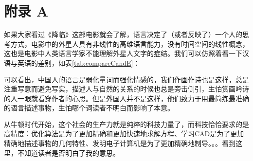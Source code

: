 \documentclass[UTF8,oneside]{ctexbook}
\begin{document}
\chapter*{附录 A}\label{fuluA}
	  如果大家看过《降临》这部电影就会了解，语言决定了（或者反映了）一个人的思考方式，电影中的外星人具有非线性的高维语言能力，没有时间空间的线性概念，这也是电影中人类语言学家不能理解外星人文字的症结。我们可以仿照着看一下汉语与英语的差别，如表\ref{tab:compareCandE}：

	  \begin{table}[!htb]
		  \renewcommand{\arraystretch}{1.3} %
		  \caption{中英对比}\label{tab:compareCandE}
		  \centering
		  \vspace{0.2cm}
	  \end{table}
	  
	  可以看出，中国人的语言是弱化量词而强化情感的，我们作画作诗也是这样，总是注重写意而避免写实，描述人与自然的关系的时候也总是旁击侧引，生怕赏画吟诗的人一眼就看穿作者的心思。但是外国人并不是这样，他们致力于用最简练最准确的语言描述事物，生怕哪个词读者不明白而影响了本意。
	  
	  从牛顿时代开始，这个社会的生产力就是纯粹的科技力量了，而科技恰恰要求的是高精度：优化算法是为了更加精确和更加快速地求解方程、学习CAD是为了更加精确地描述事物的几何特性、发明电子计算机是为了更加精确地制导。。。看到这里，不知道读者是否明白了我的意思。
\end{document}
